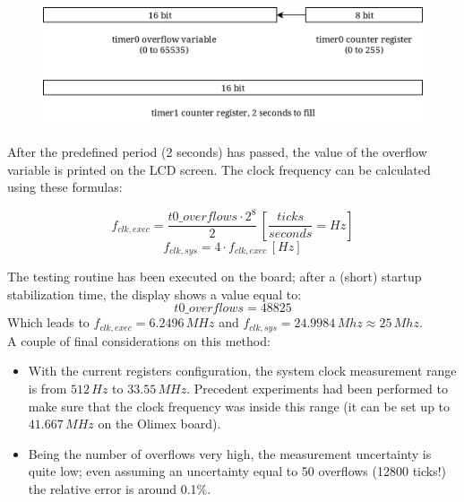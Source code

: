\begin{figure}[h]
	\centering
	\includegraphics[width=0.7\linewidth]{images/timers}
	\label{fig:timers}
\end{figure}

After the predefined period (2 seconds) has passed, the value of the overflow variable is printed on the LCD screen. The clock frequency can be calculated using these formulas:

$$ f_{clk,exec} = \frac{t0\_overflows \cdot 2^8}{2}\, \left[{\frac{ticks}{seconds} = Hz}\right]$$
$$ f_{clk,sys} = 4 \cdot f_{clk,exec}\,\left[Hz\right] $$

The testing routine has been executed on the board; after a (short) startup stabilization time, the display shows a value equal to:
$$ t0\_overflows = 48825 $$
Which leads to $f_{clk,exec} = 6.2496\,MHz$ and $f_{clk,sys} = 24.9984\,Mhz \approx 25\,Mhz$.\\

A couple of final considerations on this method:

\begin{itemize}
	\item With the current registers configuration, the system clock measurement range is from $512\,Hz$ to $33.55\,MHz$. Precedent experiments had been performed to make sure that the clock frequency was inside this range (it can be set up to $41.667\,MHz$ on the Olimex board).
	\item Being the number of overflows very high, the measurement uncertainty is quite low; even assuming an uncertainty equal to 50 overflows (12800 ticks!) the relative error is around 0.1\%.
\end{itemize}